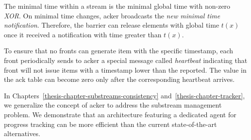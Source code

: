 The minimal time within a stream is the minimal global time with non-zero {\it XOR}. On minimal time changes, acker broadcasts the {\it new minimal time notification}. Therefore, the barrier can release elements with global time $t(x)$ once it received a notification with time greater than $t(x)$.

To ensure that no fronts can generate item with the specific timestamp, each front periodically sends to acker a special message called {\it heartbeat} indicating that front will not issue items with a timestamp lower than the reported. The value in the ack table can become zero only after the corresponding heartbeat arrives.

In Chapters~\ref{thesis-chapter-substreams-consistency} and~\ref{thesis-chapter-tracker}, we generalize the concept of acker to address the substream management problem. We demonstrate that an architecture featuring a dedicated agent for progress tracking can be more efficient than the current state-of-the-art alternatives.